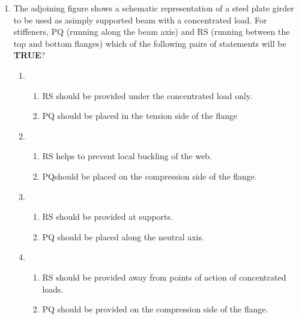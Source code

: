 \documentclass[journal,12pt,onecolumn]{IEEEtran}
\theoremstyle{remark}
\begin{document}
\begin{enumerate}
\item The adjoining figure shows a schematic representation of a steel plate girder to be used as asimply supported beam with a concentrated load. For stiffeners, PQ (running along the beam axis) and RS (running between the top and bottom flanges) which of the following pairs of statements will be \textbf{TRUE}?
\begin{figure}[ht]
\centering

\end{figure}
	\begin{enumerate}
		\item \begin{enumerate}
				\item RS should be provided under the concentrated load only.
				\item PQ should be placed in the tension side of the flange
			\end{enumerate}
		\item \begin{enumerate}
				\item RS helps to prevent local buckling of the web.
				\item PQshould be placed on the compression side of the flange.
			\end{enumerate}
		\item \begin{enumerate}
				\item RS should be provided at supports.
				\item PQ should be placed along the neutral axis.
			\end{enumerate}
		\item \begin{enumerate}
				\item RS should be provided away from points of action of concentrated loads.
				\item PQ should be provided on the compression side of the flange.
			\end{enumerate}
	\end{enumerate}


\end{enumerate}
\end{document}
